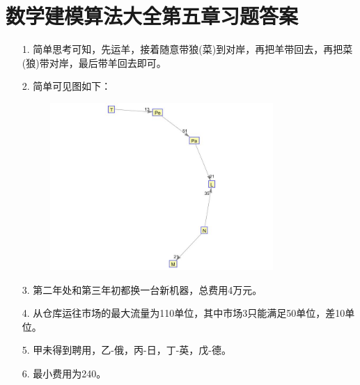 \documentclass[a4paper,20pt]{article}
\begin{document}
\section{数学建模算法大全第五章习题答案}
\begin{itemize}
    \item[1.]简单思考可知，先运羊，接着随意带狼(菜)到对岸，再把羊带回去，再把菜(狼)带对岸，最后带羊回去即可。
    \item[2.]简单可见图如下：
    \begin{figure}[h]
        \begin{center}
            \includegraphics[width=0.8\textwidth]{figure3.jpg}
        \end{center}
    \end{figure}
    \item[3.] 第二年处和第三年初都换一台新机器，总费用4万元。
    \item[4.] 从仓库运往市场的最大流量为110单位，其中市场3只能满足50单位，差10单位。
    \item[5.] 甲未得到聘用，乙-俄，丙-日，丁-英，戊-德。
    \item[6.] 最小费用为240。
\end{itemize}
\end{document}
